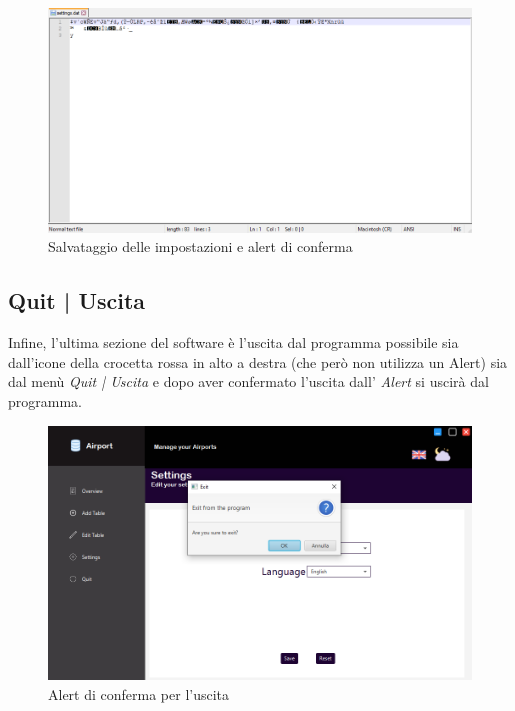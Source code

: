 \begin{figure}[H] 
	\centering
	\includegraphics[width=1\textwidth, height=1\textheight, keepaspectratio]{./img/Applicativo/salvataggio_criptato.png}
	\caption{Salvataggio delle impostazioni e alert di conferma}
	\label{fig:encrypted_save_file}
\end{figure}


\newpage

\subsection{Quit | Uscita}

\textsf{\small Infine, l'ultima sezione del software è l'uscita dal programma possibile sia dall'icone della crocetta rossa in alto a destra (che però non utilizza un Alert) sia dal menù \emph{Quit | Uscita} e dopo aver confermato l'uscita dall' \emph{Alert} si uscirà dal programma.}\\

\begin{figure}[H] 
	\centering
	\includegraphics[width=1\textwidth, height=1\textheight, keepaspectratio]{./img/Applicativo/quit_alert.png}
	\caption{Alert di conferma per l'uscita}
	\label{fig:quit_alert}
\end{figure}